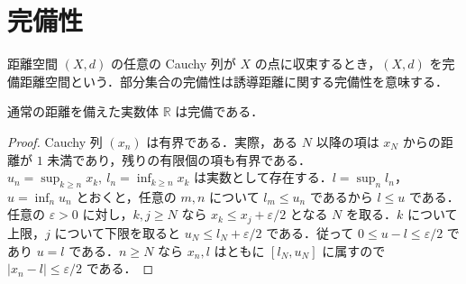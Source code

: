 \section{完備性}
\begin{defn}[完備距離空間]
距離空間 $(X,d)$ の任意の Cauchy 列が $X$ の点に収束するとき，$(X,d)$ を完備距離空間という．部分集合の完備性は誘導距離に関する完備性を意味する．
\end{defn}
\begin{prop}[実数体の距離完備性]
通常の距離を備えた実数体 $\mathbb R$ は完備である．
\end{prop}
\begin{proof}
Cauchy 列 $(x_n)$ は有界である．実際，ある $N$ 以降の項は $x_N$ からの距離が $1$ 未満であり，残りの有限個の項も有界である．$u_n=\sup_{k\geq n}x_k,\ l_n=\inf_{k\geq n}x_k$ は実数として存在する．$l=\sup_n l_n$，$u=\inf_n u_n$ とおくと，任意の $m,n$ について $l_m\leq u_n$ であるから $l\leq u$ である．任意の $\varepsilon>0$ に対し，$k,j\geq N$ なら $x_k\leq x_j+\varepsilon/2$ となる $N$ を取る．$k$ について上限，$j$ について下限を取ると $u_N\leq l_N+\varepsilon/2$ である．従って $0\leq u-l\leq\varepsilon/2$ であり $u=l$ である．$n\geq N$ なら $x_n,l$ はともに $[l_N,u_N]$ に属すので $|x_n-l|\leq\varepsilon/2$ である．
\end{proof}

